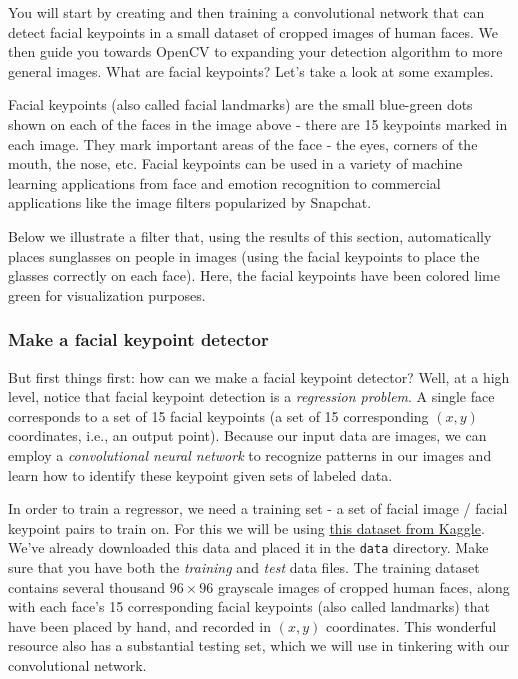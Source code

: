 \documentclass[11pt]{article}
\begin{document}
You will start by creating and then training a convolutional network
that can detect facial keypoints in a small dataset of cropped images of
human faces. We then guide you towards OpenCV to expanding your
detection algorithm to more general images. What are facial keypoints?
Let's take a look at some examples.

Facial keypoints (also called facial landmarks) are the small blue-green
dots shown on each of the faces in the image above - there are 15
keypoints marked in each image. They mark important areas of the face -
the eyes, corners of the mouth, the nose, etc. Facial keypoints can be
used in a variety of machine learning applications from face and emotion
recognition to commercial applications like the image filters
popularized by Snapchat.

Below we illustrate a filter that, using the results of this section,
automatically places sunglasses on people in images (using the facial
keypoints to place the glasses correctly on each face). Here, the facial
keypoints have been colored lime green for visualization purposes.

    \hypertarget{make-a-facial-keypoint-detector}{%
\subsubsection{Make a facial keypoint
detector}\label{make-a-facial-keypoint-detector}}

But first things first: how can we make a facial keypoint detector?
Well, at a high level, notice that facial keypoint detection is a
\emph{regression problem}. A single face corresponds to a set of 15
facial keypoints (a set of 15 corresponding \((x, y)\) coordinates,
i.e., an output point). Because our input data are images, we can employ
a \emph{convolutional neural network} to recognize patterns in our
images and learn how to identify these keypoint given sets of labeled
data.

In order to train a regressor, we need a training set - a set of facial
image / facial keypoint pairs to train on. For this we will be using
\href{https://www.kaggle.com/c/facial-keypoints-detection/data}{this
dataset from Kaggle}. We've already downloaded this data and placed it
in the \texttt{data} directory. Make sure that you have both the
\emph{training} and \emph{test} data files. The training dataset
contains several thousand \(96 \times 96\) grayscale images of cropped
human faces, along with each face's 15 corresponding facial keypoints
(also called landmarks) that have been placed by hand, and recorded in
\((x, y)\) coordinates. This wonderful resource also has a substantial
testing set, which we will use in tinkering with our convolutional
network.
\end{document}

